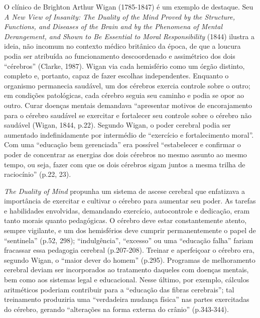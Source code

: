 O clínico de Brighton Arthur Wigan (1785-1847) é um exemplo de destaque.
Seu \emph{A New View of Insanity: The Duality of the Mind Proved by the
Structure, Functions, and Diseases of the Brain and by the Phenomena of
Mental Derangement, and Shown to Be Essential to Moral Responsibility}
(1844) ilustra a ideia, não incomum no contexto médico britânico da
época, de que a loucura podia ser atribuída ao funcionamento
descoordenado e assimétrico dos dois ``cérebros'' (Clarke, 1987). Wigan
via cada hemisfério como um órgão distinto, completo e, portanto, capaz
de fazer escolhas independentes. Enquanto o organismo permanecia
saudável, um dos cérebros exercia controle sobre o outro; em condições
patológicas, cada cérebro seguia seu caminho e podia se opor ao outro.
Curar doenças mentais demandava ``apresentar motivos de encorajamento
para o cérebro saudável se exercitar e fortalecer seu controle sobre o
cérebro não saudável (Wigan, 1844, p.22). Segundo Wigan, o poder
cerebral podia ser aumentado indefinidamente por intermédio de
``exercício e fortalecimento moral''. Com uma ``educação bem
gerenciada'' era possível ``estabelecer e confirmar o poder de
concentrar as energias dos dois cérebros no mesmo assunto ao mesmo
tempo, ou seja, fazer com que os dois cérebros sigam juntos a mesma
trilha de raciocínio'' (p.22, 23).

\emph{The Duality of Mind} propunha um sistema de ascese cerebral que
enfatizava a importância de exercitar e cultivar o cérebro para aumentar
seu poder. As tarefas e habilidades envolvidas, demandando exercício,
autocontrole e dedicação, eram tanto morais quanto pedagógicas. O
cérebro deve estar constantemente atento, sempre vigilante, e um dos
hemisférios deve cumprir permanentemente o papel de ``sentinela'' (p.52,
298); ``indulgência'', ``excesso'' ou uma ``educação falha'' fariam
fracassar essa pedagogia cerebral (p.207-208). Treinar e aperfeiçoar o
cérebro era, segundo Wigan, o ``maior dever do homem'' (p.295).
Programas de melhoramento cerebral deviam ser incorporados ao tratamento
daqueles com doenças mentais, bem como aos sistemas legal e educacional.
Nesse último, por exemplo, cálculos aritméticos poderiam contribuir para
a ``educação das fibras cerebrais''; tal treinamento produziria uma
``verdadeira mudança física'' nas partes exercitadas do cérebro, gerando
``alterações na forma externa do crânio'' (p.343-344).

